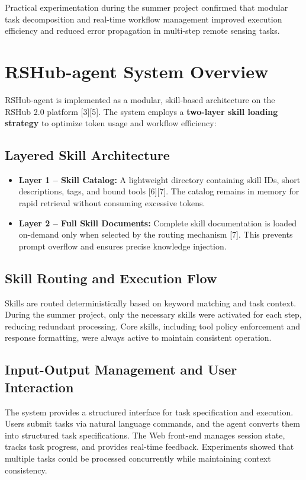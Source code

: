 {	Practical experimentation during the summer project confirmed that modular task decomposition and real-time workflow management improved execution efficiency and reduced error propagation in multi-step remote sensing tasks.
	
	\section{RSHub-agent System Overview}
	RSHub-agent is implemented as a modular, skill-based architecture on the RSHub 2.0 platform [3][5]. The system employs a \textbf{two-layer skill loading strategy} to optimize token usage and workflow efficiency:
	
	\subsection{Layered Skill Architecture}
	\begin{itemize}
		\item \textbf{Layer 1 – Skill Catalog:} A lightweight directory containing skill IDs, short descriptions, tags, and bound tools [6][7]. The catalog remains in memory for rapid retrieval without consuming excessive tokens.
		\item \textbf{Layer 2 – Full Skill Documents:} Complete skill documentation is loaded on-demand only when selected by the routing mechanism [7]. This prevents prompt overflow and ensures precise knowledge injection.
	\end{itemize}
	
	\subsection{Skill Routing and Execution Flow}
	Skills are routed deterministically based on keyword matching and task context. During the summer project, only the necessary skills were activated for each step, reducing redundant processing. Core skills, including tool policy enforcement and response formatting, were always active to maintain consistent operation.
	
	\subsection{Input-Output Management and User Interaction}
	The system provides a structured interface for task specification and execution. Users submit tasks via natural language commands, and the agent converts them into structured task specifications. The Web front-end manages session state, tracks task progress, and provides real-time feedback. Experiments showed that multiple tasks could be processed concurrently while maintaining context consistency.
	
}
